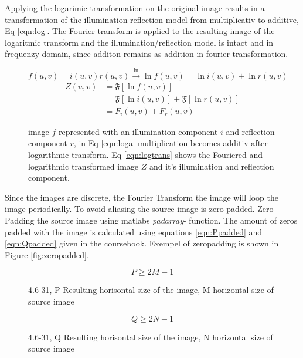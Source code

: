 Applying the logarimic transformation on the original image results in a transformation of the illumination-reflection model from multiplicativ to additive, Eq \ref{eqn:log}. The Fourier transform is applied to the resulting image of the logaritmic transform and the illumination/reflection model is intact and in frequenzy domain, since additon remains as addition in fourier transformation.
\begin{figure}[h!]
\begin{equation}
  f(u,v) = i(u,v) r(u,v) \xrightarrow{\ln} \ln{f(u,v)} = \ln{i(u,v)} + \ln{r(u,v)} 
  \label{eqn:loga}
\end{equation}
  \begin{equation}
    \begin{split}
      Z(u,v) &= \mathfrak{F} [\ln{f(u,v)}]\\ &= \mathfrak{F}[\ln{i(u,v)}] + \mathfrak{F}[\ln{r(u,v)}]\\ &= F_i(u,v) + F_r(u,v)
    \end{split}
    \label{eqn:logtrans}
  \end{equation}
\caption{image $f$ represented with an illumination component $i$ and reflection component $r$, in Eq \ref{eqn:loga} multiplication becomes additiv after logarithmic transform. Eq \ref{eqn:logtrans} shows the Fouriered and logarithmic transformed image $Z$ and it's illumination and reflection component. }
\end{figure}

Since the images are discrete, the Fourier Transform the image will loop the image periodically. To avoid aliasing the source image is zero padded. Zero Padding the source image using matlabs \textit{padarray}- function. The amount of zeros padded with the image is calculated using equations \ref{eqn:Ppadded} and \ref{eqn:Qpadded} given in the coursebook\cite[p. 274]{dipBook}. Exempel of zeropadding is shown in Figure \ref{fig:zeropadded}.
\begin{figure}[h!]
\begin{equation}
  P \geq 2M -1
  \label{eqn:Ppadded}
\end{equation}
\caption{4.6-31, P Resulting horisontal size of the image, M horizontal size of source image}
\end{figure}

\begin{figure}[h!]
  \begin{equation}
    Q \geq 2N -1
    \label{eqn:Qpadded}
  \end{equation}
  \caption{4.6-31, Q Resulting horisontal size of the image, N horizontal size of source image}
\end{figure}

